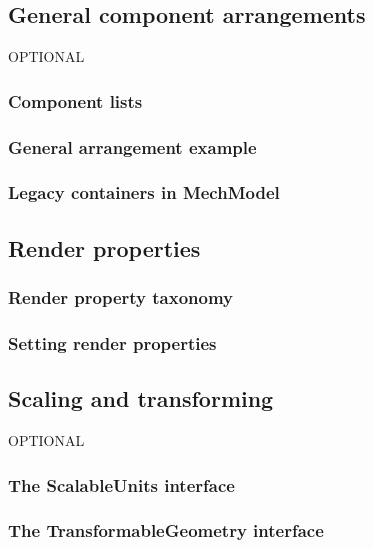 \subsection{General component arrangements}
\label{GeneralArrangements:sec}

OPTIONAL

\subsubsection{Component lists}

\subsubsection{General arrangement example}


\subsubsection{Legacy containers in MechModel}

\subsection{Render properties}
\label{RenderProperties:sec}

\subsubsection{Render property taxonomy}

\subsubsection{Setting render properties}

\subsection{Scaling and transforming}

OPTIONAL

\subsubsection{The ScalableUnits interface}

\subsubsection{The TransformableGeometry interface}
